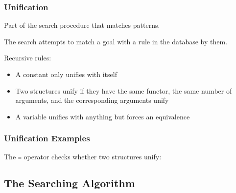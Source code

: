 \documentclass{plt}
\begin{document}
\begin{frame}
  \frametitle{Unification}

Part of the search procedure that matches patterns.

The search attempts to match a goal with a rule in the database by
 them.

Recursive rules:

\begin{itemize}
\item A constant only unifies with itself
\item Two structures unify if they have the same functor, the same
number of arguments, and the corresponding arguments unify
\item A variable unifies with anything but forces an equivalence
\end{itemize}

\end{frame}

\begin{frame}[fragile=singleslide]
  \frametitle{Unification Examples}

The \texttt{=} operator checks whether two structures unify:



\end{frame}

\newcommand{\tab}{\hspace{2pc}}

\subsection{The Searching Algorithm}
\end{document}
